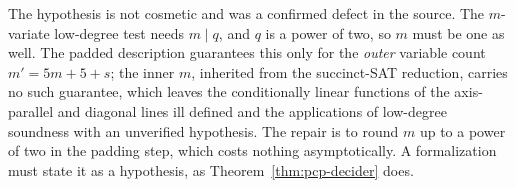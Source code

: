 \begin{remark}
\label{rem:pcp-power-of-two}
The hypothesis is not cosmetic and was a confirmed defect in the source. The $m$-variate
low-degree test needs $m \mid q$, and $q$ is a power of two, so $m$ must be one as well.
The padded description guarantees this only for the \emph{outer} variable count $m' = 5m +
5 + s$; the inner $m$, inherited from the succinct-SAT reduction, carries no such
guarantee, which leaves the conditionally linear functions of the axis-parallel and
diagonal lines ill defined and the applications of low-degree soundness with an unverified
hypothesis. The repair is to round $m$ up to a power of two in the padding step, which
costs nothing asymptotically. A formalization must state it as a hypothesis, as
Theorem~\ref{thm:pcp-decider} does.
\end{remark}

\effortHard

